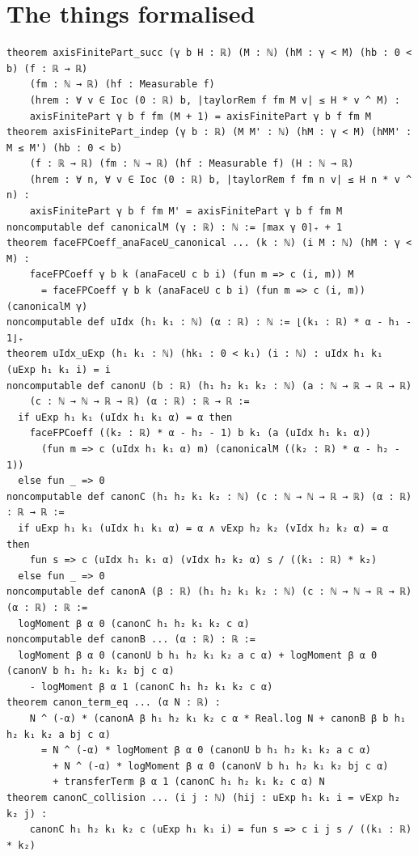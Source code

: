\documentclass[11pt]{article}
\begin{document}
\section{The things formalised}
{\small
\begin{verbatim}
theorem axisFinitePart_succ (γ b H : ℝ) (M : ℕ) (hM : γ < M) (hb : 0 < b) (f : ℝ → ℝ)
    (fm : ℕ → ℝ) (hf : Measurable f)
    (hrem : ∀ v ∈ Ioc (0 : ℝ) b, |taylorRem f fm M v| ≤ H * v ^ M) :
    axisFinitePart γ b f fm (M + 1) = axisFinitePart γ b f fm M
theorem axisFinitePart_indep (γ b : ℝ) (M M' : ℕ) (hM : γ < M) (hMM' : M ≤ M') (hb : 0 < b)
    (f : ℝ → ℝ) (fm : ℕ → ℝ) (hf : Measurable f) (H : ℕ → ℝ)
    (hrem : ∀ n, ∀ v ∈ Ioc (0 : ℝ) b, |taylorRem f fm n v| ≤ H n * v ^ n) :
    axisFinitePart γ b f fm M' = axisFinitePart γ b f fm M
noncomputable def canonicalM (γ : ℝ) : ℕ := ⌈max γ 0⌉₊ + 1
theorem faceFPCoeff_anaFaceU_canonical ... (k : ℕ) (i M : ℕ) (hM : γ < M) :
    faceFPCoeff γ b k (anaFaceU c b i) (fun m => c (i, m)) M
      = faceFPCoeff γ b k (anaFaceU c b i) (fun m => c (i, m)) (canonicalM γ)
noncomputable def uIdx (h₁ k₁ : ℕ) (α : ℝ) : ℕ := ⌊(k₁ : ℝ) * α - h₁ - 1⌋₊
theorem uIdx_uExp (h₁ k₁ : ℕ) (hk₁ : 0 < k₁) (i : ℕ) : uIdx h₁ k₁ (uExp h₁ k₁ i) = i
noncomputable def canonU (b : ℝ) (h₁ h₂ k₁ k₂ : ℕ) (a : ℕ → ℝ → ℝ → ℝ)
    (c : ℕ → ℕ → ℝ → ℝ) (α : ℝ) : ℝ → ℝ :=
  if uExp h₁ k₁ (uIdx h₁ k₁ α) = α then
    faceFPCoeff ((k₂ : ℝ) * α - h₂ - 1) b k₁ (a (uIdx h₁ k₁ α))
      (fun m => c (uIdx h₁ k₁ α) m) (canonicalM ((k₂ : ℝ) * α - h₂ - 1))
  else fun _ => 0
noncomputable def canonC (h₁ h₂ k₁ k₂ : ℕ) (c : ℕ → ℕ → ℝ → ℝ) (α : ℝ) : ℝ → ℝ :=
  if uExp h₁ k₁ (uIdx h₁ k₁ α) = α ∧ vExp h₂ k₂ (vIdx h₂ k₂ α) = α then
    fun s => c (uIdx h₁ k₁ α) (vIdx h₂ k₂ α) s / ((k₁ : ℝ) * k₂)
  else fun _ => 0
noncomputable def canonA (β : ℝ) (h₁ h₂ k₁ k₂ : ℕ) (c : ℕ → ℕ → ℝ → ℝ) (α : ℝ) : ℝ :=
  logMoment β α 0 (canonC h₁ h₂ k₁ k₂ c α)
noncomputable def canonB ... (α : ℝ) : ℝ :=
  logMoment β α 0 (canonU b h₁ h₂ k₁ k₂ a c α) + logMoment β α 0 (canonV b h₁ h₂ k₁ k₂ bj c α)
    - logMoment β α 1 (canonC h₁ h₂ k₁ k₂ c α)
theorem canon_term_eq ... (α N : ℝ) :
    N ^ (-α) * (canonA β h₁ h₂ k₁ k₂ c α * Real.log N + canonB β b h₁ h₂ k₁ k₂ a bj c α)
      = N ^ (-α) * logMoment β α 0 (canonU b h₁ h₂ k₁ k₂ a c α)
        + N ^ (-α) * logMoment β α 0 (canonV b h₁ h₂ k₁ k₂ bj c α)
        + transferTerm β α 1 (canonC h₁ h₂ k₁ k₂ c α) N
theorem canonC_collision ... (i j : ℕ) (hij : uExp h₁ k₁ i = vExp h₂ k₂ j) :
    canonC h₁ h₂ k₁ k₂ c (uExp h₁ k₁ i) = fun s => c i j s / ((k₁ : ℝ) * k₂)
\end{verbatim}
}
\end{document}

